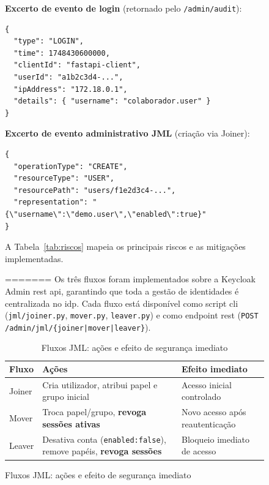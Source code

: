 \begin{figure}[h!]
\textbf{Excerto de evento de login} (retornado pelo \texttt{/admin/audit}):

\begin{lstlisting}[caption={Excerto de evento de auditoria — login bem-sucedido},label={lst:audit}]
{
  "type": "LOGIN",
  "time": 1748430600000,
  "clientId": "fastapi-client",
  "userId": "a1b2c3d4-...",
  "ipAddress": "172.18.0.1",
  "details": { "username": "colaborador.user" }
}
\end{lstlisting}

\textbf{Excerto de evento administrativo JML} (criação via Joiner):

\begin{lstlisting}[caption={Excerto de evento de administração — Joiner},label={lst:audit_admin}]
{
  "operationType": "CREATE",
  "resourceType": "USER",
  "resourcePath": "users/f1e2d3c4-...",
  "representation": "{\"username\":\"demo.user\",\"enabled\":true}"
}
\end{lstlisting}

A Tabela~\ref{tab:riscos} mapeia os principais riscos e as mitigações implementadas.

\begin{table}[h!]
\centering
\caption{Riscos e mitigações}
=======
Os três fluxos foram implementados sobre a Keycloak Admin \gls{rest} \gls{api}, garantindo que toda a gestão de identidades é centralizada no \gls{idp}. Cada fluxo está disponível como script \gls{cli} (\texttt{jml/joiner.py}, \texttt{mover.py}, \texttt{leaver.py}) e como endpoint \gls{rest} (\texttt{POST /admin/jml/\{joiner|mover|leaver\}}).

\begin{table}[h!]
\centering
\caption{Fluxos JML: ações e efeito de segurança imediato}
\label{tab:jml}
\begin{tabularx}{\textwidth}{|l|X|l|}
\hline
\textbf{Fluxo} & \textbf{Ações} & \textbf{Efeito imediato} \\ \hline
Joiner & Cria utilizador, atribui papel e grupo inicial & Acesso inicial controlado \\ \hline
Mover & Troca papel/grupo, \textbf{revoga sessões ativas} & Novo acesso após reautenticação \\ \hline
Leaver & Desativa conta (\texttt{enabled:false}), remove papéis, \textbf{revoga sessões} & Bloqueio imediato de acesso \\ \hline
\end{tabularx}
\end{table}


\end{table}
\end{figure}
